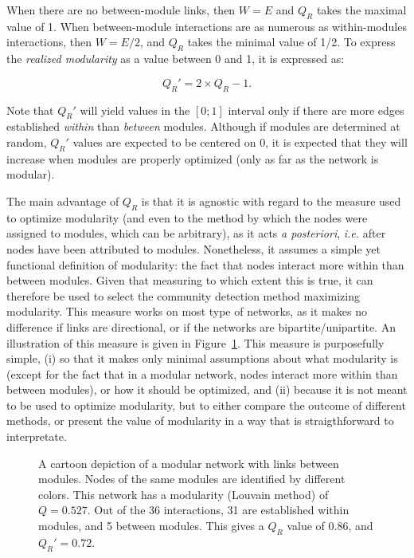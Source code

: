 \documentclass[12pt,oneside]{article}
\begin{document}
When there are no between-module links, then $W = E$ and $Q_R$ takes the
maximal value of 1. When between-module interactions are as numerous as
within-modules interactions, then $W = E/2$, and $Q_R$ takes the minimal value
of 1/2. To express the \emph{realized modularity} as a value between 0 and 1,
it is expressed as:

\begin{equation}
Q_R' = 2\times Q_R - 1 .
\label{e:tqr}
\end{equation}

Note that $Q_R'$ will yield values in the $[0;1]$ interval only if there are
more edges established \emph{within} than \emph{between} modules. Although if
modules are determined at random, $Q_R'$ values are expected to be centered on
0, it is expected that they will increase when modules are properly optimized
(only as far as the network is modular).

The main advantage of $Q_R$ is that it is agnostic with regard to the measure
used to optimize modularity (and even to the method by which the nodes were
assigned to modules, which can be arbitrary), as it acts \emph{a posteriori},
\emph{i.e.} after nodes have been attributed to modules. Nonetheless, it
assumes a simple yet functional definition of modularity: the fact that
nodes interact more within than between modules. Given that measuring to
which extent this is true, it can therefore be used to select the community
detection method maximizing modularity. This measure works on most type
of networks, as it makes no difference if links are directional, or if
the networks are bipartite/unipartite. An illustration of this measure
is given in Figure~\ref{f:illu}. This measure is purposefully simple,
(i) so that it makes only minimal assumptions about what modularity is
(except for the fact that in a modular network, nodes interact more within
than between modules), or how it should be optimized, and (ii) because it
is not meant to be used to optimize modularity, but to either compare the
outcome of different methods, or present the value of modularity in a way
that is straigthforward to interpretate.

\begin{figure}[tb]
\begin{center}

\end{center}
\caption{A cartoon depiction of a modular network with links between modules. Nodes of the same modules are identified by different colors. This network has a modularity (Louvain method) of $Q = 0.527$. Out of the 36 interactions, 31 are established within modules, and 5 between modules. This gives a $Q_R$ value of 0.86, and $Q_R' = 0.72$.}
\label{f:illu}
\end{figure}
\end{document}
